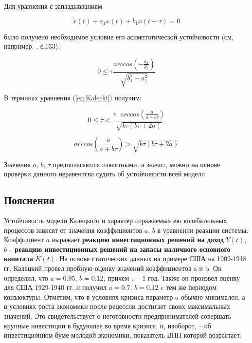 Для уравнения с запаздывваниям

\begin{equation}
\dot{x}(t) + a_1 x(t) + b_1 x(t-\tau) = 0
\end{equation}

было получено необходимое условие его асимптотической устойчивости (см, например, \cite{bib:Elsgoltz-Norkin}, с.133):

\begin{equation}
0 \leq \tau \dfrac{arccos \left( -\frac{a_1}{b_1} \right)}{\sqrt{b_1^2-a_1^2}}
\end{equation}

В терминах уравнения (\ref{eq:Kalecki}) получим:

\begin{equation}
0 \leq \tau < \dfrac{\tau \text{ } arccos \left( \frac{a}{a + b \tau} \right) }{\sqrt{b \tau (b \tau + 2a)}}
\end{equation}

\begin{equation}\label{eq:Kalecki-stab}
arccos \left( \frac{a}{a + b \tau} \right) > \sqrt{b \tau (b \tau + 2a)}
\end{equation}

Значения $a$, $b$, $\tau$ предполагаются известными, а значит, можно на основе проверки данного неравентсва судить об устойчивости всей модели.

\subsection{Пояснения}\label{sec:what}

Устойчивость модели Калецкого и характер отражаемых ею колебательных процессов зависят от значения коэффициентов $a$, $b$ в уравнении реакции системы. Коэффициент $a$ выражает \textbf{реакцию инвестиционных решений на доход} $Y(t)$, $b$ \--- \textbf{реакцию инвестиционных решений на запасы наличного основного капитала} $K(t)$. На основе статических данных на примере США на 1909-1918 гг. Калецкий провел пробную оценку значений коэффициентов a и b. Он определил, что $a=0.95$, $b=0.12$, причем $\tau$ \--- 1 год. Также он произвел оценку для США 1929-1940 гг. и получил $a=0.7$, $b=0.12$ c тем же периодом конъюктуры. Отметим, что в условиях кризиса параметр $a$ обычно минимален, а в условиях роста экономики после рецессии достигает своих максимальных значений. Это свидетельствует о неготовности предпринимателей совершать крупные инвестиции в будующее во время кризиса, и, наоборот, \--- об инвестиционном буме молодой экономики, показатель ВНП которой возрастает.

